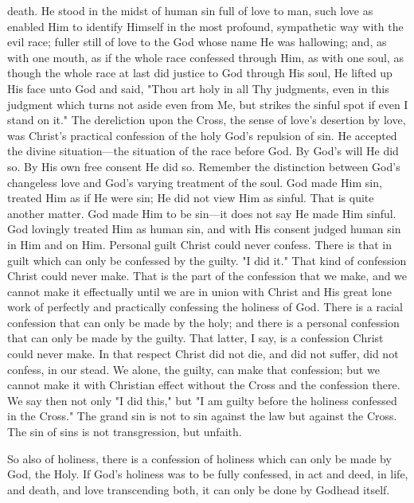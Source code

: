 \documentclass[12pt,a5paper,twoside,titlepage]{book}
\begin{document}
death. He stood in the midst of human sin 
full of love to man, such love as enabled Him 
to identify Himself in the most profound, sympathetic 
way with the evil race; fuller still of 
love to the God whose name He was hallowing; 
and, as with one mouth, as if the whole race 
confessed through Him, as with one soul, as 
though the whole race at last did justice to God 
through His soul, He lifted up His face unto 
God and said, "Thou art holy in all Thy judgments, 
even in this judgment which turns not 
aside even from Me, but strikes the sinful spot if 
even I stand on it." The dereliction upon the 
Cross, the sense of love's desertion by love, was 
Christ's practical confession of the holy God's 
repulsion of sin. He accepted the divine situation---the 
situation of the race before God. By 
God's will He did so. By His own free consent 
He did so. Remember the distinction between 
God's changeless love and God's varying treatment 
of the soul. God made Him sin, treated 
Him as if He were sin; He did not view Him as 
sinful. That is quite another matter. God made 
Him to be sin---it does not say He made Him sinful. 
God lovingly treated Him as human sin, and 
with His consent judged human sin in Him and 
on Him. Personal guilt Christ could never confess. 
There is that in guilt which can only be 
confessed by the guilty. "I did it." That kind 
of confession Christ could never make. That is 
the part of the confession that we make, and we 
cannot make it effectually until we are in union 
with Christ and His great lone work of perfectly 
and practically confessing the holiness 
of God. There is a racial confession that can 
only be made by the holy; and there is a personal 
confession that can only be made by the 
guilty. That latter, I say, is a confession Christ 
could never make. In that respect Christ did 
not die, and did not suffer, did not confess, in 
our stead. We alone, the guilty, can make 
that confession; but we cannot make it with 
Christian effect without the Cross and the 
confession there. We say then not only "I did 
this," but "I am guilty before the holiness 
confessed in the Cross." The grand sin is 
not to sin against the law but against the 
Cross. The sin of sins is not transgression, 
but unfaith. 

So also of holiness, there is a confession of 
holiness which can only be made by God, the 
Holy. If God's holiness was to be fully confessed, 
in act and deed, in life, and death, and 
love transcending both, it can only be done by 
Godhead itself. 
\end{document}
